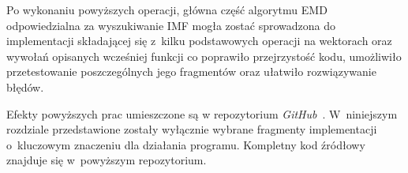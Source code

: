 Po wykonaniu powyższych operacji, główna część algorytmu EMD odpowiedzialna za
wyszukiwanie IMF mogła zostać sprowadzona do implementacji składającej się
z~kilku podstawowych operacji na wektorach oraz wywołań opisanych wcześniej
funkcji co poprawiło przejrzystość kodu, umożliwiło przetestowanie
poszczególnych jego fragmentów oraz ułatwiło rozwiązywanie błędów.

Efekty powyższych prac umieszczone są w repozytorium \textit{GitHub}~\cite{GIT}.
W~niniejszym rozdziale przedstawione zostały wyłącznie wybrane fragmenty
implementacji o~kluczowym znaczeniu dla działania programu. Kompletny kod
źródłowy znajduje się w~powyższym repozytorium.